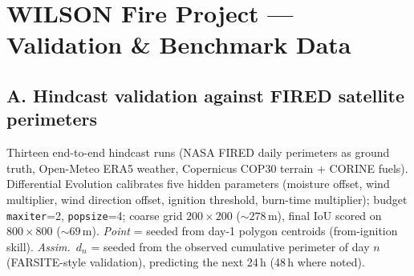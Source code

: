 \documentclass[11pt]{article}
\begin{document}
\section*{WILSON Fire Project --- Validation \& Benchmark Data}

\subsection*{A. Hindcast validation against FIRED satellite perimeters}

Thirteen end-to-end hindcast runs (NASA FIRED daily perimeters as ground
truth, Open-Meteo ERA5 weather, Copernicus COP30 terrain + CORINE fuels).
Differential Evolution calibrates five hidden parameters (moisture offset,
wind multiplier, wind direction offset, ignition threshold, burn-time
multiplier); budget \texttt{maxiter}=2, \texttt{popsize}=4; coarse grid
$200{\times}200$ (${\sim}278$\,m), final IoU scored on $800{\times}800$
(${\sim}69$\,m). \emph{Point} = seeded from day-1 polygon centroids
(from-ignition skill). \emph{Assim.}~$d_n$ = seeded from the observed
cumulative perimeter of day $n$ (FARSITE-style validation), predicting the
next 24\,h (48\,h where noted).
\end{document}
